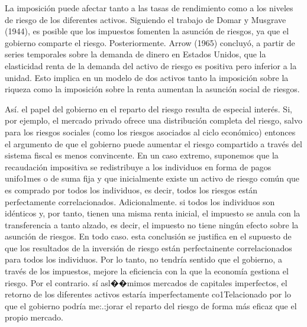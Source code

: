 \documentclass[10pt,a4paper]{article}
\begin{document}
La imposición puede afectar tanto a las tasas de rendimiento como a los niveles de riesgo de los diferentes activos. Siguiendo el trabajo de Domar y Musgrave (1944), es posible que los impuestos fomenten la asunción de riesgos, ya que el gobierno comparte el riesgo. Posteriormente. Arrow (1965) concluyó, a partir de series temporales sobre la demanda de dinero en Estados Unidos, que la elasticidad renta de la demanda del activo de riesgo es positiva pero inferior a la unidad. Esto implica en un modelo de dos activos tanto la imposición sobre la riqueza como la imposición sobre la renta aumentan la asunción social de riesgos. 

Así. el papel del gobierno en el reparto del riesgo resulta de especial interés. Si, por ejemplo, el mercado privado ofrece una distribución completa del riesgo, salvo para los riesgos sociales (como los riesgos asociados al ciclo económico) entonces el argumento de que el gobierno puede aumentar el riesgo compartido a través del sistema fiscal es menos convincente. En un caso extremo, suponemos que la recaudación impositiva se redistribuye a los individuos en forma de pagos unifo1mes o de suma fija y que inicialmente existe un activo de riesgo común que es comprado por todos los individuos, es decir, todos los riesgos están perfectamente correlacionados. Adicionalmente. si todos los individuos son idénticos y, por tanto, tienen una misma renta inicial, el impuesto se anula con la transferencia a tanto alzado, es decir, el impuesto no tiene ningún efecto sobre la asunción de riesgos. En todo caso. esta conclusión se justifica en el supuesto de que los resultados de la inversión de riesgo están perfectainente correlacionados para todos los individuos. Por lo tanto, no tendría sentido que el gobierno, a través de los impuestos, mejore la eficiencia con la que la economía gestiona el riesgo. Por el contrario. sí asl��mimos mercados de capitales imperfectos, el retorno de los diferentes activos estaría imperfectamente co1Telacionado por lo que el gobierno podría me:.:jorar el reparto del riesgo de forma más eficaz que el propio mercado.
\end{document}
